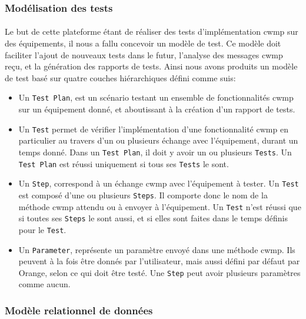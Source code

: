 \documentclass[12pt,a4paper]{report}
\begin{document}
\subsubsection{Modélisation des tests}
\paragraph*{}Le but de cette plateforme étant de réaliser des tests d'implémentation \gls{cwmp} sur des équipements, il nous a fallu concevoir un modèle de test. Ce modèle doit faciliter l'ajout de nouveaux tests dans le futur, l'analyse des messages \gls{cwmp} reçu, et la génération des rapports de tests. Ainsi nous avons produits un modèle de test basé sur quatre couches hiérarchiques défini comme suis: 
\begin{itemize}
\item Un \texttt{Test Plan}, est un scénario testant un ensemble de fonctionnalités \gls{cwmp} sur un équipement donné, et aboutissant à la création d'un rapport de tests.
\item Un \texttt{Test} permet de vérifier l'implémentation d'une fonctionnalité \gls{cwmp} en particulier au travers d'un ou plusieurs échange avec l'équipement, durant un temps donné. Dans un \texttt{Test Plan}, il doit y avoir un ou plusieurs \texttt{Tests}. Un \texttt{Test Plan} est réussi uniquement si tous ses \texttt{Tests} le sont.
\item Un \texttt{Step}, correspond à un échange \gls{cwmp} avec l'équipement à tester. Un \texttt{Test} est composé d'une ou plusieurs \texttt{Steps}. Il comporte donc le nom de la méthode \gls{cwmp} attendu ou à envoyer à l'équipement. Un \texttt{Test} n'est réussi que si toutes ses \texttt{Steps} le sont aussi, et si elles sont faites dans le temps définis pour le \texttt{Test}.
\item Un \texttt{Parameter}, représente un paramètre envoyé dans une méthode \gls{cwmp}. Ils peuvent à la fois être donnés par l'utilisateur, mais aussi défini par défaut par Orange, selon ce qui doit être testé. Une \texttt{Step} peut avoir plusieurs paramètres comme aucun. \\
\end{itemize} 
\subsubsection{Modèle relationnel de données}
\end{document}
